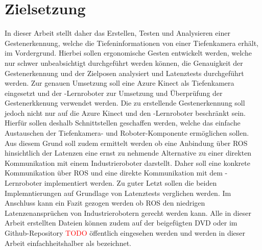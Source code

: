 \section{Zielsetzung} \label{sec:zielsetzung} %
In dieser Arbeit stellt daher das Erstellen, Testen und Analysieren einer Gestenerkennung, welche die Tiefeninformationen von einer Tiefenkamera erhält, im Vordergrund. Hierbei sollen ergonomische Gesten entwickelt werden, welche nur schwer unbeabsichtigt durchgeführt werden können, die Genauigkeit der Gestenerkennung und der Zielposen analysiert und Latenztests durchgeführt werden. Zur genauen Umsetzung soll eine Azure Kinect als Tiefenkamera eingesetzt und der -Lernroboter zur Umsetzung und Überprüfung der Gestenerkkenung verwendet werden. Die zu erstellende Gestenerkennung soll jedoch nicht nur auf die Azure Kinect und den -Lernroboter beschränkt sein. Hierfür sollen deshalb Schnittstellen geschaffen werden, welche das einfache Austauschen der Tiefenkamera- und Roboter-Komponente ermöglichen sollen. Aus diesem Grund soll zudem ermittelt werden ob eine Anbindung über ROS hinsichtlich der Latenzen eine ernst zu nehmende Alternative zu einer direkten Kommunikation mit einem Industrieroboter darstellt. Daher soll eine konkrete Kommunikation über ROS und eine direkte Kommunikation mit dem -Lernroboter implementiert werden. Zu guter Letzt sollen die beiden Implemntierungen auf Grundlage von Latenztests verglichen werden. Im Anschluss kann ein Fazit gezogen werden ob ROS den niedrigen Latenzenansprüchen von Industrierobotern gerecht werden kann. Alle in dieser Arbeit erstellten Dateien können zudem auf der beigefügten DVD oder im Github-Repository \textcolor{red}{TODO} öffentlich eingesehen werden und werden in dieser Arbeit ein­fach­heits­hal­ber als  bezeichnet.

